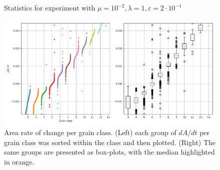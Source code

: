\begin{figure}[ht]
{     \label{fig:coupled_1_nsides}
    }
    \caption[Statistics for Coupled Model.]{Statistics for experiment with $\mu=10^{-2}, \lambda=1, \varepsilon=2\cdot10^{-1}$}
    \label{fig:coupled_1}
\end{figure}

\begin{figure}[ht]
    \centering
    \includegraphics[scale=0.5]{figures/coupled/output_30/result__845_6_dadt.pdf}
    \caption[Area rate of change per grain class for Coupled Model.]{Area rate of change per grain class. (Left) each group of $dA/dt$ per grain class was sorted within the class and then plotted. (Right) The same groups are presented as box-plots, with the median highlighted in orange.}
    \label{fig:coupled_1_dadt}
\end{figure}

